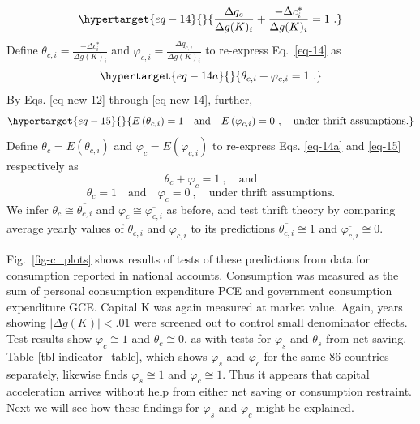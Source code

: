%
\begin{equation}\protect\hypertarget{eq-14}{}{\frac{ \Delta q_{c}}{ \Delta g(K)_{i}} + \frac{- \Delta c^{*}_{i}}{ \Delta g(K)_{i}} = 1\ .}\label{eq-14}\end{equation}
%
Define \(\theta_{c,i} = \frac{- \Delta c^{*}_{i}}{ \Delta g(K)_{i}}\)
and \(\varphi_{c,i} = \frac{ \Delta q_{c,i}}{ \Delta g(K)_{i}}\) to
re-express Eq.~\eqref{eq-14} as
%
\begin{equation}\protect\hypertarget{eq-14a}{}{\theta_{c,i} + \varphi_{c,i} = 1\ .}\label{eq-14a}\end{equation}
%
By Eqs. \eqref{eq-new-12} through \eqref{eq-new-14}, further,
%
\begin{equation}\protect\hypertarget{eq-15}{}{E\left( \theta_{c,i} \right) = 1 \quad \text{and} \quad E\left( \varphi_{c,i} \right) = 0 \ , \quad
\text{under thrift assumptions.}}\label{eq-15}\end{equation}
%
Define \(\theta_{c} = E\left( \theta_{c,i} \right)\) and
\(\varphi_{c} = E\left( \varphi_{c,i} \right)\) to re-express
Eqs. \eqref{eq-14a} and \eqref{eq-15} respectively as
\begin{equation}
    \theta_c + \varphi_c = 1 \ , \quad \text{and}
    \label{eq-new-4}
\end{equation}
\vspace{-5ex}
\begin{equation}
    \theta_c = 1 \quad \text{and} \quad \varphi_c = 0 \ , \quad \text{under thrift assumptions.}
    \label{eq-23}
\end{equation}
We infer \(\theta_c \cong \overline{\theta_{c,i}}\) and \(\varphi_c \cong \overline{\varphi_{c,i}}\) as before, and test thrift theory by comparing average yearly values of $\theta_{c,i}$ and $\varphi_{c,i}$ to its predictions $\overline{\theta_{c,i}} \cong 1$ and $\overline{\varphi_{c,i}} \cong 0$.

Fig.~\ref{fig-c_plots} shows results of tests of these predictions from
data for consumption reported in national accounts. Consumption was
measured as the sum of personal consumption expenditure PCE and
government consumption expenditure GCE. Capital K was again measured at
market value. Again, years showing \(|\Delta g(K)| < .01\) were screened
out to control small denominator effects. Test results show
\(\varphi_{c} \cong 1\) and \(\theta_{c} \cong 0\), as with tests for
\(\varphi_{s}\) and \(\theta_{s}\) from net saving. Table \ref{tbl-indicator_table}, which shows $\varphi_s$ and $\varphi_{c}$ for the same 86 countries separately, likewise finds $\varphi_s \cong 1$ and $\varphi_c \cong 1$. Thus it appears
that capital acceleration arrives without help from either net
saving or consumption restraint. Next we will see how
these findings for \(\varphi_{s}\) and \(\varphi_{c}\) might be
explained.
  
